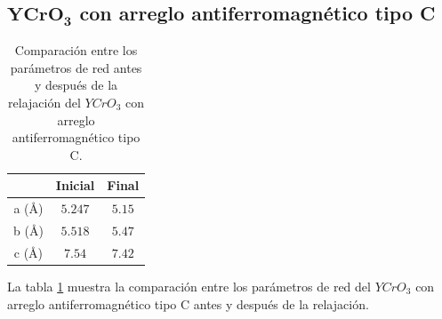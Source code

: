 \subsection{$\mathbf{YCrO_{3}}$ con arreglo antiferromagn\'etico tipo C}

\begin{table}[H]
    \begin{center}
        \caption{Comparaci\'on entre los par\'ametros de red antes y despu\'es 
            de la relajaci\'on del $YCrO_{3}$ con arreglo antiferromagn\'etico 
            tipo C.}
        \begin{tabular}{ccc}
            \hline
            & \textbf{Inicial} \cite{geller1956} & \textbf{Final} \\
            \hline \hline
            a (\AA) & $5.247$  & $5.15$   \\
            \hline
            b (\AA) & $5.518$ & $5.47$   \\
            \hline
            c (\AA) & $7.54$ & $7.42$   \\
            \hline
        \end{tabular}
        \singlespace
        \label{yco_c_ini_fin}
    \end{center}
\end{table}

\noindent La tabla \ref{yco_c_ini_fin} muestra la comparaci\'on entre los 
par\'ametros de red del $YCrO_{3}$ con arreglo antiferromagn\'etico tipo C 
antes y despu\'es de la relajaci\'on.

